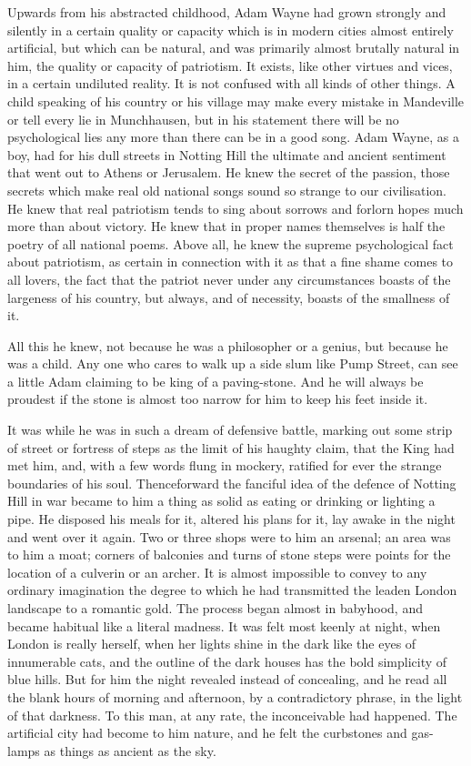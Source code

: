 \documentclass{book}
\begin{document}
Upwards from his abstracted childhood, Adam Wayne had grown strongly and silently in a certain quality or capacity which is in modern cities almost entirely artificial, but which can be natural, and was primarily almost brutally natural in him, the quality or capacity of patriotism. It exists, like other virtues and vices, in a certain undiluted reality. It is not confused with all kinds of other things. A child speaking of his country or his village may make every mistake in Mandeville or tell every lie in Munchhausen, but in his statement there will be no psychological lies any more than there can be in a good song. Adam Wayne, as a boy, had for his dull streets in Notting Hill the ultimate and ancient sentiment that went out to Athens or Jerusalem. He knew the secret of the passion, those secrets which make real old national songs sound so strange to our civilisation. He knew that real patriotism tends to sing about sorrows and forlorn hopes much more than about victory. He knew that in proper names themselves is half the poetry of all national poems. Above all, he knew the supreme psychological fact about patriotism, as certain in connection with it as that a fine shame comes to all lovers, the fact that the patriot never under any circumstances boasts of the largeness of his country, but always, and of necessity, boasts of the smallness of it.

All this he knew, not because he was a philosopher or a genius, but because he was a child. Any one who cares to walk up a side slum like Pump Street, can see a little Adam claiming to be king of a paving-stone. And he will always be proudest if the stone is almost too narrow for him to keep his feet inside it.

It was while he was in such a dream of defensive battle, marking out some strip of street or fortress of steps as the limit of his haughty claim, that the King had met him, and, with a few words flung in mockery, ratified for ever the strange boundaries of his soul. Thenceforward the fanciful idea of the defence of Notting Hill in war became to him a thing as solid as eating or drinking or lighting a pipe. He disposed his meals for it, altered his plans for it, lay awake in the night and went over it again. Two or three shops were to him an arsenal; an area was to him a moat; corners of balconies and turns of stone steps were points for the location of a culverin or an archer. It is almost impossible to convey to any ordinary imagination the degree to which he had transmitted the leaden London landscape to a romantic gold. The process began almost in babyhood, and became habitual like a literal madness. It was felt most keenly at night, when London is really herself, when her lights shine in the dark like the eyes of innumerable cats, and the outline of the dark houses has the bold simplicity of blue hills. But for him the night revealed instead of concealing, and he read all the blank hours of morning and afternoon, by a contradictory phrase, in the light of that darkness. To this man, at any rate, the inconceivable had happened. The artificial city had become to him nature, and he felt the curbstones and gas-lamps as things as ancient as the sky.
\end{document}

